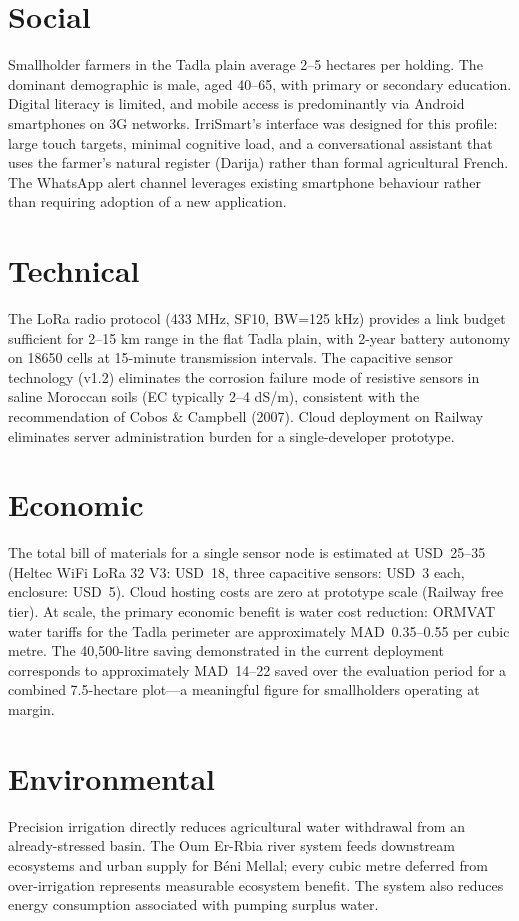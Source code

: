 \documentclass[12pt,a4paper]{report}
\begin{document}
\section{Social}
Smallholder farmers in the Tadla plain average 2--5 hectares per holding. The dominant demographic is male, aged 40--65, with primary or secondary education. Digital literacy is limited, and mobile access is predominantly via Android smartphones on 3G networks. IrriSmart's interface was designed for this profile: large touch targets, minimal cognitive load, and a conversational assistant that uses the farmer's natural register (Darija) rather than formal agricultural French. The WhatsApp alert channel leverages existing smartphone behaviour rather than requiring adoption of a new application.

\section{Technical}
The LoRa radio protocol (433 MHz, SF10, BW=125 kHz) provides a link budget sufficient for 2--15 km range in the flat Tadla plain, with 2-year battery autonomy on 18650 cells at 15-minute transmission intervals. The capacitive sensor technology (v1.2) eliminates the corrosion failure mode of resistive sensors in saline Moroccan soils (EC typically 2--4 dS/m), consistent with the recommendation of Cobos \& Campbell (2007). Cloud deployment on Railway eliminates server administration burden for a single-developer prototype.

\section{Economic}
The total bill of materials for a single sensor node is estimated at USD~25--35 (Heltec WiFi LoRa 32 V3: USD~18, three capacitive sensors: USD~3 each, enclosure: USD~5). Cloud hosting costs are zero at prototype scale (Railway free tier). At scale, the primary economic benefit is water cost reduction: ORMVAT water tariffs for the Tadla perimeter are approximately MAD~0.35--0.55 per cubic metre. The 40,500-litre saving demonstrated in the current deployment corresponds to approximately MAD~14--22 saved over the evaluation period for a combined 7.5-hectare plot---a meaningful figure for smallholders operating at margin.

\section{Environmental}
Precision irrigation directly reduces agricultural water withdrawal from an already-stressed basin. The Oum Er-Rbia river system feeds downstream ecosystems and urban supply for Béni Mellal; every cubic metre deferred from over-irrigation represents measurable ecosystem benefit. The system also reduces energy consumption associated with pumping surplus water.
\end{document}
